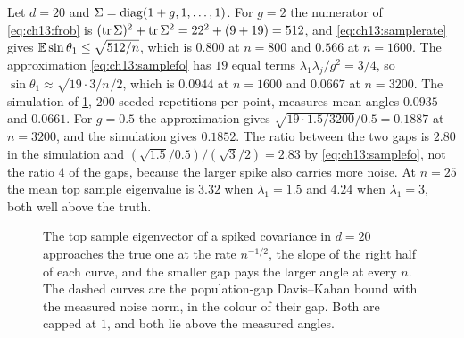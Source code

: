 \begin{example}\label{ex:ch13:sample}
Let $d=20$ and $\Sigma=\operatorname{diag}(1+g,1,\dots,1)$. For $g=2$ the numerator of
\cref{eq:ch13:frob} is $(\operatorname{tr}\Sigma)^2+\operatorname{tr}\Sigma^2=22^2+(9+19)=512$, and
\cref{eq:ch13:samplerate} gives $\mathbb{E}\sin\theta_1\le\sqrt{512/n}$, which is $0.800$
at $n=800$ and $0.566$ at $n=1600$. The approximation \cref{eq:ch13:samplefo} has
$19$ equal terms $\lambda_1\lambda_j/g^2=3/4$, so
$\sin\theta_1\approx\sqrt{19\cdot3/n}/2$, which is $0.0944$ at $n=1600$ and
$0.0667$ at $n=3200$. The simulation of \cref{fig:ch13:sample}, $200$ seeded
repetitions per point, measures mean angles $0.0935$ and $0.0661$. For $g=0.5$
the approximation gives $\sqrt{19\cdot1.5/3200}/0.5=0.1887$ at $n=3200$, and the
simulation gives $0.1852$. The ratio between the two gaps is $2.80$ in the
simulation and $(\sqrt{1.5}/0.5)/(\sqrt3/2)=2.83$ by \cref{eq:ch13:samplefo}, not
the ratio $4$ of the gaps, because the larger spike also carries more noise. At
$n=25$ the mean top sample eigenvalue is $3.32$ when $\lambda_1=1.5$ and $4.24$
when $\lambda_1=3$, both well above the truth.
\end{example}

\begin{figure}[tbp]
\centering
{}
\caption{The top sample eigenvector of a spiked covariance in $d=20$ approaches
the true one at the rate $n^{-1/2}$, the slope of the right half of each curve,
and the smaller gap pays the larger angle at every $n$. The dashed curves are the
population-gap Davis--Kahan bound with the measured noise norm, in the colour of
their gap. Both are capped at $1$, and both lie above the
measured angles.}
\label{fig:ch13:sample}
\end{figure}

